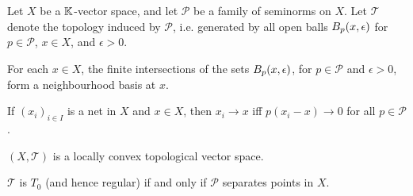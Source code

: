 \documentclass[article, a4paper, 11pt, oneside]{memoir}
\numberwithin{equation}{chapter}
\newcommand{\calT}{\mathcal{T}}
\newcommand{\calP}{\mathcal{P}}
\begin{document}
\begin{theorem}
    \label{thm:seminorm-topology}
    Let $X$ be a $\field$-vector space, and let $\calP$ be a family of seminorms on $X$. Let $\calT$ denote the topology induced by $\calP$, i.e. generated by all open balls $\ball[p]{x}{\epsilon}$ for $p \in \calP$, $x \in X$, and $\epsilon > 0$.

    \begin{enumthm}
        \item \label{enum:LCS-nhood-basis} For each $x \in X$, the finite intersections of the sets $\ball[p]{x}{\epsilon}$, for $p \in \calP$ and $\epsilon > 0$, form a neighbourhood basis at $x$.

        \item \label{enum:LCS-net-convergence} If $(x_i)_{i \in I}$ is a net in $X$ and $x \in X$, then $x_i \to x$ iff $p(x_i - x) \to 0$ for all $p \in \calP$.

        \item \label{enum:seminorm-topology-is-LCS} $(X,\calT)$ is a locally convex topological vector space.

        \item \label{enum:seminorm-topology-separating} $\calT$ is $T_0$ (and hence regular) if and only if $\calP$ separates points in $X$.
    \end{enumthm}
\end{theorem}
\end{document}
